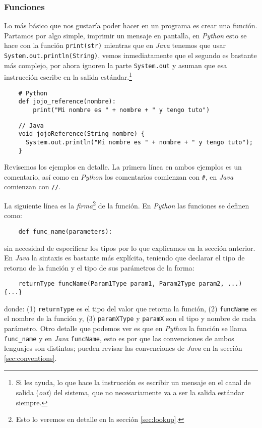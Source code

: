 \subsubsection{Funciones}
  Lo más básico que nos gustaría poder hacer en un programa es crear una función.
  Partamos por algo simple, imprimir un mensaje en pantalla, en \textit{Python} esto se hace con la 
  función \texttt{print(str)} mientras que en \textit{Java} tenemos que usar 
  \texttt{System.out.println(String)}, vemos inmediatamente que el segundo es bastante más
  complejo, por ahora ignoren la parte \texttt{System.out} y asuman que esa instrucción 
  escribe en la salida estándar.\footnote{Si les ayuda, lo que hace la instrucción es escribir un 
  mensaje en el canal de salida (\textit{out}) del sistema, que no necesariamente va a ser la salida
  estándar siempre.}

  \begin{verbatim}
    # Python
    def jojo_reference(nombre):
        print("Mi nombre es " + nombre + " y tengo tuto")
  \end{verbatim}

  \begin{verbatim}
    // Java
    void jojoReference(String nombre) {
      System.out.println("Mi nombre es " + nombre + " y tengo tuto");
    }
  \end{verbatim}

  Revisemos los ejemplos en detalle.
  La primera línea en ambos ejemplos es un comentario, así como en \textit{Python} los comentarios
  comienzan con \texttt{#}, en \textit{Java} comienzan con \texttt{//}.

  La siguiente línea es la \textit{firma}\footnote{Esto lo veremos en detalle en la sección 
  \ref{sec:lookup}.} de la función.
  En \textit{Python} las funciones se definen como:
  \begin{verbatim}
    def func_name(parameters):
  \end{verbatim}
  sin necesidad de especificar los tipos por lo que explicamos en la sección anterior.
  En \textit{Java} la sintaxis es bastante más explícita, teniendo que declarar el tipo de retorno de
  la función y el tipo de sus parámetros de la  forma:
  \begin{verbatim}
    returnType funcName(Param1Type param1, Param2Type param2, ...) {...}
  \end{verbatim}
  donde: (1) \texttt{returnType} es el tipo del valor que retorna la función, (2) \texttt{funcName} es
  el nombre de la función y, (3) \texttt{paramXType} y \texttt{paramX} son el tipo y nombre de cada 
  parámetro.
  Otro detalle que podemos ver es que en \textit{Python} la función se llama \texttt{func\_name} y en 
  \textit{Java} \texttt{funcName}, esto es por que las convenciones de ambos lenguajes son 
  distintas; pueden revisar las convenciones de \textit{Java} en la sección \ref{sec:conventions}.
  
